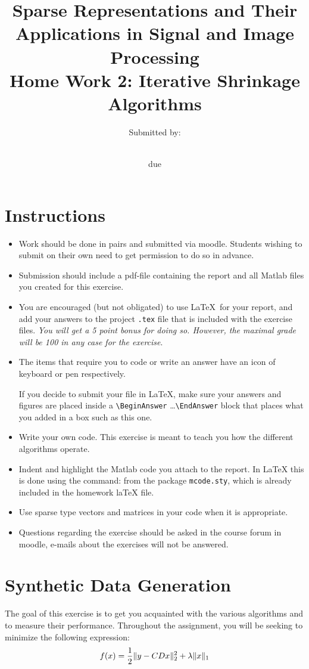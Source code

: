 \documentclass[]{article}
\title{Sparse Representations and Their Applications in Signal and Image Processing \break\\
	 Home Work 2: Iterative Shrinkage Algorithms}
\author{Submitted by: \begin{tabular}{cc}
		\StudentA & \StudentIdA \\ 
		\StudentB  & \StudentIdB 
	\end{tabular}}
\date{due \dueDate}
\newcommand \BeginAnswer {\begin{mdframed}[backgroundcolor=blue!15]}
\newcommand{\EndAnswer}{\end{mdframed}}
\begin{document}
\maketitle
\section*{Instructions} 
 
\begin{itemize}
	\item Work should be done in pairs and submitted via moodle. Students wishing to submit on their own need to get permission to do so in advance. 
	\item Submission should include a pdf-file containing the report and all Matlab files you created for this exercise.
	\item You are encouraged (but not obligated) to use \LaTeX\ for your report, and add your answers to the project \texttt{.tex} file that is included with the exercise files. \emph{You will get a 5 point bonus for doing so. However, the maximal grade will be 100 in any case for the exercise}.
	\item The items that require you to code or write an answer have an icon of keyboard or pen respectively.
	\BeginAnswer
	If you decide to submit your file in LaTeX, make sure your answers and figures are placed inside a 
	\texttt{\textbackslash BeginAnswer} \ldots \texttt{\textbackslash EndAnswer} 
	block that places what you added in a box such as this one.
	\EndAnswer 
	\item Write your own code. This exercise is meant to teach you how the different algorithms operate.
	\item Indent and highlight the Matlab code you attach to the report. In LaTeX this is done using the command: \lstinline|| from the package \lstinline|mcode.sty|, which is already included in the homework laTeX file. 
	\item Use sparse type vectors and matrices in your code when it is appropriate.
	\item Questions regarding the exercise should be asked in the course forum in moodle, e-mails about the exercises will not be answered.    
\end{itemize}

\section{ Synthetic Data Generation} 
The goal of this exercise is to get you acquainted with the various algorithms and to measure their performance. Throughout the assignment, you will be seeking to minimize the following expression:
\begin{equation}
f(x) =  {1\over 2}\|y-CDx\|^2_2 +\lambda \|x\|_1 \label{eq1}
\end{equation} 
\end{document}
